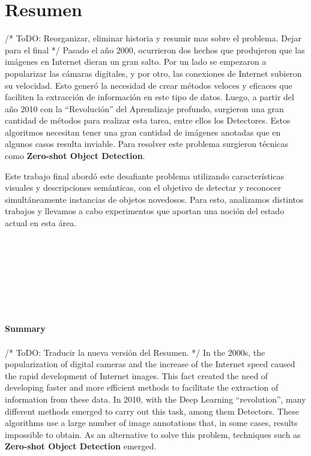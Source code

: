 \documentclass[12pt,twosided]{book}
\begin{document}
\chapter*{Resumen}

\pagestyle{plain}

/* ToDO: Reorganizar, eliminar historia  y resumir mas sobre el problema. Dejar para el final */
Pasado el año 2000, ocurrieron dos hechos que produjeron que las imágenes en Internet dieran un gran salto. Por un lado se empezaron a popularizar las cámaras digitales, y por otro, las conexiones de Internet subieron su velocidad. Esto generó la necesidad de crear métodos veloces y eficaces que faciliten la extracción de información en este tipo de datos. Luego, a partir del año 2010 con la  ``Revolución'' del Aprendizaje profundo, surgieron una gran cantidad de métodos para realizar esta tarea, entre ellos los Detectores. Estos algoritmos necesitan tener una gran cantidad de imágenes anotadas que en algunos casos resulta inviable. Para resolver este problema surgieron técnicas como \textbf{Zero-shot Object Detection}. 

Este trabajo final abordó este desafiante problema utilizando características visuales y descripciones semánticas, con el objetivo de detectar y reconocer simultáneamente instancias de objetos novedosos. Para esto, analizamos distintos trabajos y llevamos a cabo experimentos que aportan una noción del estado actual en esta área. \\\\\\\\\\\\\\\\\\
{\huge\textbf{Summary}}\\\\

/* ToDO: Traducir la nueva versión del Resumen. */
In the 2000s, the popularization of digital cameras and the increase of the Internet speed caused the rapid development of Internet images. This fact created the need of developing faster and more efficient methods to facilitate the extraction of information from these data. In 2010, with the Deep Learning ``revolution'', many different methods emerged to carry out this task, among them Detectors. These algorithms use a large number of image annotations that, in some cases, results impossible to obtain. As an alternative to solve this problem, techniques such as \textbf{Zero-shot Object Detection} emerged. 
\end{document}
